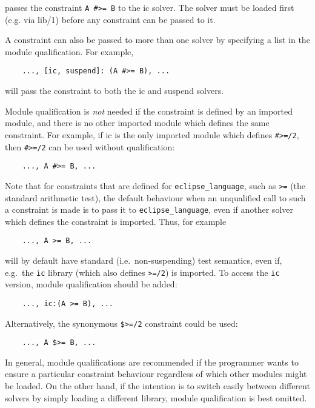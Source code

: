 \noindent
passes the constraint \verb'A #>= B' to the ic solver. The solver must be
loaded first (e.g. via lib/1) before any constraint can be passed to it.

A constraint can also be passed to more than one solver by specifying a
list in the module qualification. For example,

\begin{verbatim}
    ..., [ic, suspend]: (A #>= B), ...
\end{verbatim}

\noindent
will pass the constraint to both the ic and suspend solvers. 

Module qualification is {\em not} needed if the constraint is defined by an
imported module, and there is no other imported module
which defines the same constraint. For example, if ic is the only imported
module which defines \verb'#>=/2', then \verb'#>=/2' can be used without 
qualification:

\begin{verbatim}
    ..., A #>= B, ...
\end{verbatim}

Note that for constraints that are defined for \verb'eclipse_language',
such as \verb'>=' (the standard arithmetic test), the default behaviour
when an unqualified call to such a
constraint is made is to pass it to \verb'eclipse_language',
even if another solver which defines the constraint is imported.
Thus, for example
\begin{verbatim}
    ..., A >= B, ...
\end{verbatim}

\noindent
will by default have standard (i.e.\ non-suspending) test semantics, even
if, e.g.\ the \verb'ic' library (which also defines \verb'>=/2') is
imported. To access the \verb'ic' version, module qualification should
be added:
\begin{verbatim}
    ..., ic:(A >= B), ...
\end{verbatim}
Alternatively, the synonymous \verb'$>=/2' constraint could be used:
\begin{verbatim}
    ..., A $>= B, ...
\end{verbatim}

In general, module qualifications are recommended if the programmer
wants to ensure a particular constraint behaviour regardless of which
other modules might be loaded.  On the other hand, if the intention is
to switch easily between different solvers by simply loading a
different library, module qualification is best omitted.

